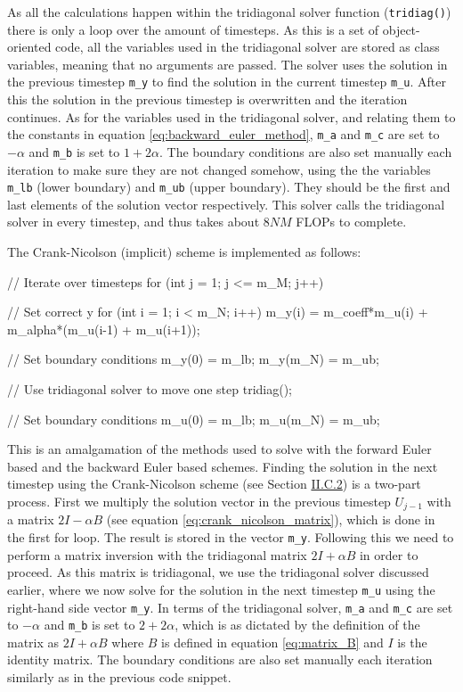 \documentclass[reprint,english,notitlepage]{revtex4-1}  %
\begin{document}
As all the calculations happen within the tridiagonal solver function (\verb+tridiag()+) there is only a loop over the amount of timesteps. As this is a set of object-oriented code, all the variables used in the tridiagonal solver are stored as class variables, meaning that no arguments are passed. The solver uses the solution in the previous timestep \verb+m_y+ to find the solution in the current timestep \verb+m_u+. After this the solution in the previous timestep is overwritten and the iteration continues. As for the variables used in the tridiagonal solver, and relating them to the constants in equation \eqref{eq:backward_euler_method}, \verb+m_a+ and \verb+m_c+ are set to $-\alpha$ and \verb+m_b+ is set to $1 + 2\alpha$. The boundary conditions are also set manually each iteration to make sure they are not changed somehow, using the the variables \verb+m_lb+ (lower boundary) and \verb+m_ub+ (upper boundary). They should be the first and last elements of the solution vector respectively. This solver calls the tridiagonal solver in every timestep, and thus takes about $8NM$ FLOPs to complete.

The Crank-Nicolson (implicit) scheme is implemented as follows:

\begin{cpp}
// Iterate over timesteps
for (int j = 1; j <= m_M; j++){
  // Set correct y
  for (int i = 1; i < m_N; i++){
    m_y(i) = m_coeff*m_u(i) + m_alpha*(m_u(i-1) + m_u(i+1));
  }

  // Set boundary conditions
  m_y(0) = m_lb;
  m_y(m_N) = m_ub;

  // Use tridiagonal solver to move one step
  tridiag();

  // Set boundary conditions
  m_u(0) = m_lb;
  m_u(m_N) = m_ub;
}
\end{cpp}

This is an amalgamation of the methods used to solve with the forward Euler based and the backward Euler based schemes. Finding the solution in the next timestep using the Crank-Nicolson scheme (see Section \hyperref[sec:formalism_crank_nicolson]{II.C.2}) is a two-part process. First we multiply the solution vector in the previous timestep $U_{j-1}$ with a matrix $2I - \alpha B$ (see equation \eqref{eq:crank_nicolson_matrix}), which is done in the first for loop. The result is stored in the vector \verb+m_y+. Following this we need to perform a matrix inversion with the tridiagonal matrix $2I + \alpha B$ in order to proceed. As this matrix is tridiagonal, we use the tridiagonal solver discussed earlier, where we now solve for the solution in the next timestep \verb+m_u+ using the right-hand side vector \verb+m_y+. In terms of the tridiagonal solver, \verb+m_a+ and \verb+m_c+ are set to $-\alpha$ and \verb+m_b+ is set to $2 + 2\alpha$, which is as dictated by the definition of the matrix as $2I + \alpha B$ where $B$ is defined in equation \eqref{eq:matrix_B} and $I$ is the identity matrix. The boundary conditions are also set manually each iteration similarly as in the previous code snippet.
\end{document}

